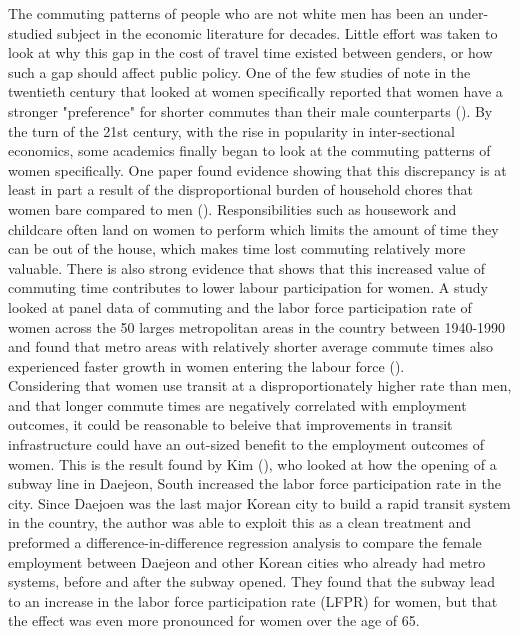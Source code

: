 \documentclass{article}
\begin{document}
The commuting patterns of people who are not white men has been an under-studied subject in the economic literature for decades. Little effort was taken to look at why this gap in the cost of travel time existed between genders, or how such a gap should affect public policy. One of the few studies of note in the twentieth century that looked at women specifically reported that women have a stronger "preference" for shorter commutes than their male counterparts (\cite{blumen_gender_1994}).  By the turn of the 21st century, with the rise in popularity in inter-sectional economics, some academics finally began to look at the commuting patterns of women specifically. One paper found evidence showing that this discrepancy is at least in part a result of the disproportional burden of household chores that women bare compared to men (\cite{roberts_its_2011}). Responsibilities such as housework and childcare often land on women to perform which limits the amount of time they can be out of the house, which makes time lost commuting relatively more valuable. There is also strong evidence that shows that this increased value of commuting time contributes to lower labour participation for women. A study looked at panel data of commuting and the labor force participation rate of women across the 50 larges metropolitan areas in the country between 1940-1990 and found that metro areas with relatively shorter average commute times also experienced faster growth in women entering the labour force (\cite{black_why_2014}).\\

Considering that women use transit at a disproportionately higher rate than men, and that longer commute times are negatively correlated with employment outcomes, it could be reasonable to beleive that improvements in transit infrastructure could have an out-sized benefit to the employment outcomes of women. This is the result found by Kim (\citeyear{kim_subways_2019}), who looked at how the opening of a subway line in Daejeon, South increased the labor force participation rate in the city. Since Daejoen was the last major Korean city to build a rapid transit system in the country, the author was able to exploit this as a clean treatment and preformed a difference-in-difference regression analysis to compare the female employment between Daejeon and other Korean cities who already had metro systems, before and after the subway opened. They found that the subway lead to an increase in the labor force participation rate (LFPR) for women, but that the effect was even more pronounced for women over the age of 65. \\
\end{document}
